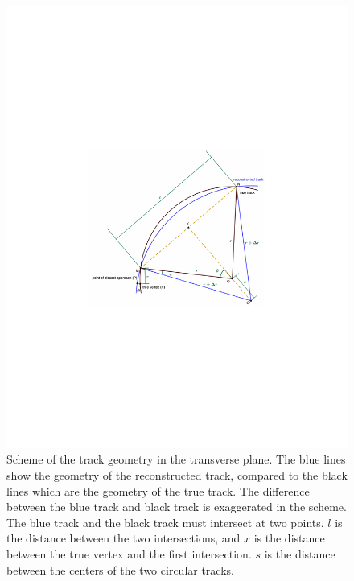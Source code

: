 \begin{figure}[!htb]
      \centering
      \captionsetup{justification=justified}
      \includegraphics[width=\textwidth]{pics/muon_corr/GeoFit/d0_pt_geometry.pdf}
      \caption{Scheme of the track geometry in the transverse plane. 
               The blue lines show the geometry of the reconstructed track, 
               compared to the black lines which are the geometry of the true track.
               The difference between the blue track and black track is exaggerated in the scheme.
               The blue track and the black track must intersect at two points.
               $l$ is the distance between the two intersections, 
               and $x$ is the distance between the true vertex and the first intersection.
               $s$ is the distance between the centers of the two circular tracks.}
      \label{fig:d0_pt_scheme}
\end{figure}

